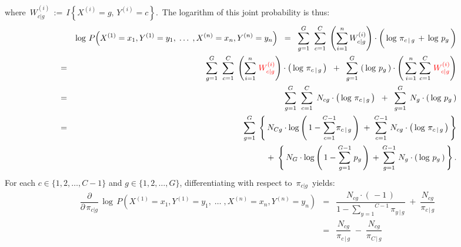 \begin{enumerate}
	where
	\,$W^{(i)}_{c \vert g} \,:=\, I\!\left\{X^{(i)}=g,\,Y^{(i)}=c\right\}$.\,
	The logarithm of this joint probability is thus:
	\begin{eqnarray*}
	&&
		\log\,P\!\left(X^{(1)} = x_{1},Y^{(1)}=y_{1}, \;\ldots\; ,X^{(n)} = x_{n},Y^{(n)}=y_{n}\right)
	\;\;=\;\;
		\overset{G}{\underset{g=1}{\sum}} \;\; \overset{C}{\underset{c=1}{\sum}} \;
		\left(\overset{n}{\underset{i=1}{\sum}}\,W^{(i)}_{c \vert g}\right)
		\cdot
		\left(\,\log\,\pi_{c\,\vert\,g} \,\overset{{\color{white}\vert}}{+}\, \log\,p_{g}\,\right)
	\\
	&=&
		\overset{G}{\underset{g=1}{\sum}} \;\; \overset{C}{\underset{c=1}{\sum}} \;
		\left(\overset{n}{\underset{i=1}{\sum}}\;{\color{red}W^{(i)}_{c \vert g}}\right)
		\cdot
		\left(\,\log\,\pi_{c\,\vert\,g}\,\right)
		\;\; + \;\;
		\overset{G}{\underset{g=1}{\sum}} \, \left(\,\log\,p_{g}\,\right)
		\cdot
		\left(\,
			\overset{n}{\underset{i=1}{\sum}} \;
			\overset{C}{\underset{c=1}{\sum}} \;
			{\color{red}W^{(i)}_{c \vert g}}
		\right)
	\\
	&=&
		\overset{G}{\underset{g=1}{\sum}} \;\; \overset{C}{\underset{c=1}{\sum}} \;\,
		N_{cg} \cdot \left(\,\log\,\pi_{c\,\vert\,g}\,\right)
		\;\; + \;\;
		\overset{G}{\underset{g=1}{\sum}} \;\, N_{g} \cdot \left(\,\log\,p_{g}\,\right)
	\\
	&=&
		\overset{G}{\underset{g=1}{\sum}} \;
		\left\{\,
			N_{Cg}
			\cdot
			\log\left(\,1 - \overset{C-1}{\underset{c=1}{\sum}}\pi_{c\,\vert\,g}\,\right)
			\; + \;
			\overset{C-1}{\underset{c=1}{\sum}} \; N_{cg}
			\cdot
			\left(\,\log\,\pi_{c\,\vert\,g}\,\right)
		\,\right\}
	\\
	&&
		+ \;
		\left\{\,
			N_{G}
			\cdot
			\log\left(\,1 - \overset{G-1}{\underset{g=1}{\sum}}\;p_{g}\,\right)
			\, + \,
			\overset{G-1}{\underset{g=1}{\sum}} \; N_{g}
			\cdot
			\left(\,\log\,p_{g}\,\right)
		\,\right\}.
	\end{eqnarray*}
	For each $c \in \{1,2,\ldots,C-1\}$ and $g \in \{1,2,\ldots,G\}$,
	differentiating with respect to \,$\pi_{c \vert g}$\, yields:
	\begin{eqnarray*}
	\dfrac{\partial}{\partial\,\pi_{c \vert g}}\,
	\log\,P\!\left(X^{(1)} = x_{1},Y^{(1)}=y_{1}, \;\ldots\; ,X^{(n)} = x_{n},Y^{(n)}=y_{n}\right)
	&=&
		\dfrac{N_{cg}\cdot(\,-1\,)}{1 - \overset{C-1}{\underset{y=1}{\sum}}\pi_{y\,\vert\,g}}
		\; + \;
		\dfrac{N_{cg}}{\pi_{c\,\vert\,g}}
	\\
	&=&
		\dfrac{N_{cg}}{\pi_{c\,\vert\,g}}
		\; - \;
		\dfrac{N_{cg}}{\pi_{C\,\vert\,g}}
	\end{eqnarray*}

\end{enumerate}
